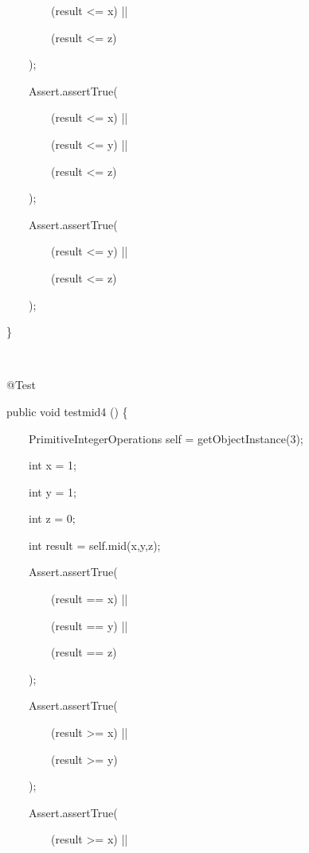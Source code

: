 \documentclass{article}
\newenvironment{tmindent}{\begin{tmparmod}{1.5em}{0pt}{0pt} }{\end{tmparmod}}
\newenvironment{tmparmod}[3]{\begin{list}{}{\setlength{\topsep}{0pt}\setlength{\leftmargin}{#1}\setlength{\rightmargin}{#2}\setlength{\parindent}{#3}\setlength{\listparindent}{\parindent}\setlength{\itemindent}{\parindent}\setlength{\parsep}{\parskip}} \item[]}{\end{list}}
\newenvironment{tmparsep}[1]{\begingroup\setlength{\parskip}{#1}}{\endgroup}
\begin{document}
\begin{example}
\begin{tmindent}
\begin{tmparsep}{0em}
      \ \ \ \ \ \ \ \ \ \ \ (result <= x) ||
      
      \ \ \ \ \ \ \ \ \ \ \ (result <= z)
      
      \ \ \ \ \ \ \ );
      
      \ \ \ \ \ \ \ Assert.assertTrue(
      
      \ \ \ \ \ \ \ \ \ \ \ (result <= x) ||
      
      \ \ \ \ \ \ \ \ \ \ \ (result <= y) ||
      
      \ \ \ \ \ \ \ \ \ \ \ (result <= z)
      
      \ \ \ \ \ \ \ );
      
      \ \ \ \ \ \ \ Assert.assertTrue(
      
      \ \ \ \ \ \ \ \ \ \ \ (result <= y) ||
      
      \ \ \ \ \ \ \ \ \ \ \ (result <= z)
      
      \ \ \ \ \ \ \ );
      
      \ \ \ \}
      
      \ \ \
      
      \ \ \ @Test
      
      \ \ \ public void testmid4 () \{
      
      \ \ \ \ \ \ \ PrimitiveIntegerOperations self = getObjectInstance(3);
      
      \ \ \ \ \ \ \ int x = 1;
      
      \ \ \ \ \ \ \ int y = 1;
      
      \ \ \ \ \ \ \ int z = 0;
      
      \ \ \ \ \ \ \ int result = self.mid(x,y,z);
      
      \ \ \ \ \ \ \ Assert.assertTrue(
      
      \ \ \ \ \ \ \ \ \ \ \ (result == x) ||
      
      \ \ \ \ \ \ \ \ \ \ \ (result == y) ||
      
      \ \ \ \ \ \ \ \ \ \ \ (result == z)
      
      \ \ \ \ \ \ \ );
      
      \ \ \ \ \ \ \ Assert.assertTrue(
      
      \ \ \ \ \ \ \ \ \ \ \ (result >= x) ||
      
      \ \ \ \ \ \ \ \ \ \ \ (result >= y)
      
      \ \ \ \ \ \ \ );
      
      \ \ \ \ \ \ \ Assert.assertTrue(
      
      \ \ \ \ \ \ \ \ \ \ \ (result >= x) ||
      

\end{tmparsep}
\end{tmindent}
\end{example}
\end{document}
